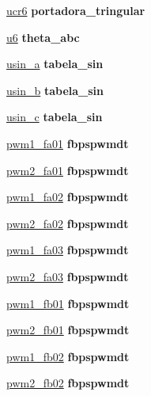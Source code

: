 \begin{DoxyCompactItemize}
\hyperlink{class_d_e0___n_a_n_o___v_f_1_1_m_a_i_n_a73a6d2830e220c40555fa4962cf56729}{ucr6}  {\bfseries portadora\+\_\+tringular}   
\item 
\hyperlink{class_d_e0___n_a_n_o___v_f_1_1_m_a_i_n_a7224f4e1fe574ededc997672ec003469}{u6}  {\bfseries theta\+\_\+abc}   
\item 
\hyperlink{class_d_e0___n_a_n_o___v_f_1_1_m_a_i_n_ac102afa1d5f3fdb36ad74a9a6b4c849b}{usin\+\_\+a}  {\bfseries tabela\+\_\+sin}   
\item 
\hyperlink{class_d_e0___n_a_n_o___v_f_1_1_m_a_i_n_a6fd4abe647632bcba2e1d5cbce67d4ec}{usin\+\_\+b}  {\bfseries tabela\+\_\+sin}   
\item 
\hyperlink{class_d_e0___n_a_n_o___v_f_1_1_m_a_i_n_abea29a06c5b9632538ab33ef5cf540c8}{usin\+\_\+c}  {\bfseries tabela\+\_\+sin}   
\item 
\hyperlink{class_d_e0___n_a_n_o___v_f_1_1_m_a_i_n_aa3ae3c9f4efdb351bb0a85ffcd62a5c7}{pwm1\+\_\+fa01}  {\bfseries fbpspwmdt}   
\item 
\hyperlink{class_d_e0___n_a_n_o___v_f_1_1_m_a_i_n_addfae6beda08c9f2b7b4323c8fbac268}{pwm2\+\_\+fa01}  {\bfseries fbpspwmdt}   
\item 
\hyperlink{class_d_e0___n_a_n_o___v_f_1_1_m_a_i_n_a6e035999f47dfab0fae082411c438eae}{pwm1\+\_\+fa02}  {\bfseries fbpspwmdt}   
\item 
\hyperlink{class_d_e0___n_a_n_o___v_f_1_1_m_a_i_n_a830079cbe468e7463dc9209c02e7db26}{pwm2\+\_\+fa02}  {\bfseries fbpspwmdt}   
\item 
\hyperlink{class_d_e0___n_a_n_o___v_f_1_1_m_a_i_n_ad15352d9634f571dc9f7b859348e881b}{pwm1\+\_\+fa03}  {\bfseries fbpspwmdt}   
\item 
\hyperlink{class_d_e0___n_a_n_o___v_f_1_1_m_a_i_n_af44d263a15cbebf123af72935f293add}{pwm2\+\_\+fa03}  {\bfseries fbpspwmdt}   
\item 
\hyperlink{class_d_e0___n_a_n_o___v_f_1_1_m_a_i_n_ada74642ae88c21e66ec5358b912770cb}{pwm1\+\_\+fb01}  {\bfseries fbpspwmdt}   
\item 
\hyperlink{class_d_e0___n_a_n_o___v_f_1_1_m_a_i_n_aebdc45725e2d22ebcb42481065eafdc6}{pwm2\+\_\+fb01}  {\bfseries fbpspwmdt}   
\item 
\hyperlink{class_d_e0___n_a_n_o___v_f_1_1_m_a_i_n_aa9b6a252e2423edd83f59f0c620c8695}{pwm1\+\_\+fb02}  {\bfseries fbpspwmdt}   
\item 
\hyperlink{class_d_e0___n_a_n_o___v_f_1_1_m_a_i_n_afcbd248eab723a65868ce6825d11b832}{pwm2\+\_\+fb02}  {\bfseries fbpspwmdt}   
\item 

\end{DoxyCompactItemize}
